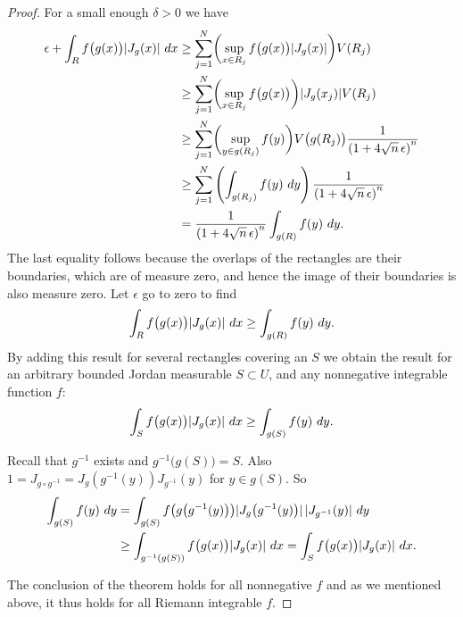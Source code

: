 \begin{proof}
For a small enough
$\delta > 0$ we have
\begin{equation*}
\begin{split}
\epsilon + \int_R f\bigl(g(x)\bigr) \lvert {J_g(x)} \rvert ~ dx
& \geq
\sum_{j=1}^N \biggl(\sup_{x \in R_j} f\bigl(g(x)\bigr) \lvert {J_g(x)} \rvert \biggr) V(R_j)
\\
& \geq
\sum_{j=1}^N \biggl(\sup_{x \in R_j} f\bigl(g(x)\bigr) \biggr) \lvert {J_g(x_j)} \rvert V(R_j)
\\
& \geq
\sum_{j=1}^N \biggl(\sup_{y \in g(R_j)} f(y) \biggr)
V\bigl(g(R_j)\bigr)
\frac{1}{{(1+4\sqrt{n} \, \epsilon)}^n}
\\
& \geq
\sum_{j=1}^N \left(\int_{g(R_j)}f(y) ~dy \right)
\frac{1}{{(1+4\sqrt{n} \, \epsilon)}^n}
\\
& =
\frac{1}{{(1+4\sqrt{n} \, \epsilon)}^n}
\int_{g(R)} f(y) ~dy .
\end{split}
\end{equation*}
The last equality follows because the overlaps of the rectangles
are their boundaries, which are of measure zero, and hence the image
of their boundaries is also measure zero.
Let $\epsilon$ go to zero to find
\begin{equation*}
\int_R f\bigl(g(x)\bigr) \lvert {J_g(x)} \rvert ~ dx \geq \int_{g(R)} f(y) ~dy .
\end{equation*}
By adding this result for several rectangles covering an $S$ we obtain the
result for an arbitrary bounded Jordan measurable $S \subset U$,
and any nonnegative integrable function $f$:
\begin{equation*}
\int_S f\bigl(g(x)\bigr) \lvert {J_g(x)} \rvert ~ dx \geq \int_{g(S)} f(y) ~dy .
\end{equation*}

Recall that $g^{-1}$ exists and $g^{-1}\bigl(g(S)\bigr) = S$.
Also $1 = J_{g\circ g^{-1}} = J_g(g^{-1}(y))J_{g^{-1}}(y)$ for $y \in g(S)$.
So
\begin{equation*}
\begin{split}
\int_{g(S)} f(y) ~ dy
& =
\int_{g(S)} f\bigl(g\bigl(g^{-1}(y)\bigr)\bigr)
\lvert {J_g\bigl(g^{-1}(y)\bigr)} \rvert \, \lvert {J_{g^{-1}}(y)} \rvert ~ dy
\\
& \geq
\int_{g^{-1}(g(S))} f\bigl(g(x)\bigr) \lvert {J_g(x)} \rvert ~ dx
=
\int_{S} f\bigl(g(x)\bigr) \lvert {J_g(x)} \rvert ~ dx .
\end{split}
\end{equation*}

The conclusion of the theorem holds
for all nonnegative $f$ and as we
mentioned above, it thus holds for all Riemann integrable $f$.
\end{proof}

